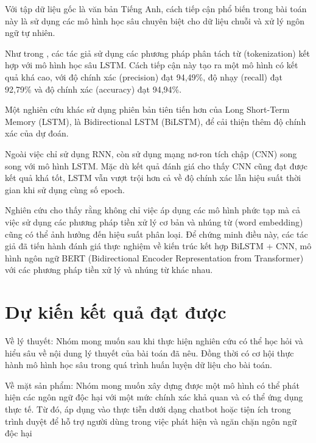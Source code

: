 Với tập dữ liệu gốc là văn bản Tiếng Anh, cách tiếp cận phổ biến trong bài toán này là sử dụng các mô hình học sâu chuyên biệt cho dữ liệu chuỗi và xử lý ngôn ngữ tự nhiên.

Như trong \cite{9339521}, các tác giả sử dụng các phương pháp phân tách từ (tokenization) kết hợp với mô hình học sâu LSTM. Cách tiếp cận này tạo ra một mô hình có kết quả khá cao, với độ chính xác (precision) đạt 94,49\%, độ nhạy (recall) đạt 92,79\% và độ chính xác (accuracy) đạt 94,94\%.

Một nghiên cứu khác sử dụng phiên bản tiên tiến hơn của Long Short-Term Memory (LSTM), là Bidirectional LSTM (BiLSTM), để cải thiện thêm độ chính xác của dự đoán\cite{webpage25}.

Ngoài việc chỉ sử dụng RNN, \cite{Sharma_Patel_2018} còn sử dụng mạng nơ-ron tích chập (CNN) song song với mô hình LSTM. Mặc dù kết quả đánh giá cho thấy CNN cũng đạt được kết quả khá tốt, LSTM vẫn vượt trội hơn cả về độ chính xác lẫn hiệu suất thời gian khi sử dụng cùng số epoch.

Nghiên cứu \cite{Kresnakova} cho thấy rằng không chỉ việc áp dụng các mô hình phức tạp mà cả việc sử dụng các phương pháp tiền xử lý cơ bản và nhúng từ (word embedding) cũng có thể ảnh hưởng đến hiệu suất phân loại. Để chứng minh điều này, các tác giả đã tiến hành đánh giá thực nghiệm về kiến trúc kết hợp BiLSTM + CNN, mô hình ngôn ngữ BERT (Bidirectional Encoder Representation from Transformer) với các phương pháp tiền xử lý và nhúng từ khác nhau.

\section{Dự kiến kết quả đạt được}
Về lý thuyết: Nhóm mong muốn sau khi thực hiện nghiên cứu có thể học hỏi và hiểu sâu về nội dung lý thuyết của bài toán đã nêu. Đồng thời có cơ hội thực hành mô hình học sâu trong quá trình huấn luyện dữ liệu cho bài toán.

Về mặt sản phẩm: Nhóm mong muốn xây dựng được một mô hình có thể phát hiện các ngôn ngữ độc hại với một mức chính xác khả quan và có thể ứng dụng thực tế. Từ đó, áp dụng vào thực tiễn dưới dạng chatbot hoặc tiện ích trong trình duyệt để hỗ trợ người dùng trong việc phát hiện và ngăn chặn ngôn ngữ độc hại

